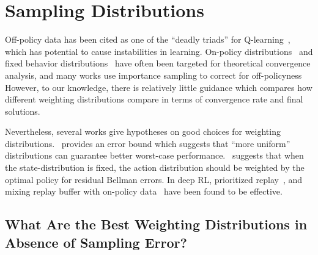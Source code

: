 \section{Sampling Distributions}
\label{sec:sampling_distributions}


Off-policy data has been cited as one of the ``deadly triads'' for Q-learning~\citep{suttonrlbook}, which has potential to cause instabilities in learning. On-policy distributions~\citep{Tsitsiklis1997} and fixed behavior distributions~\citep{Sutton09a,Maei2010} have often been targeted for theoretical convergence analysis, and many works use importance sampling to correct for off-policyness~\citep{precup2001offpol, munos2016safe}
However, to our knowledge, there is relatively little guidance which compares how different weighting distributions compare in terms of convergence rate and final solutions.

Nevertheless, several works give hypotheses on good choices for weighting distributions.~\citep{munos2005erroravi} provides an error bound which suggests that ``more uniform'' distributions can guarantee better worst-case performance.~\citep{NIPS2017_6913} suggests that when the state-distribution is fixed, the action distribution should be weighted by the optimal policy for residual Bellman errors. In deep RL, prioritized replay~\citep{Schaul2015}, and mixing replay buffer with on-policy data~\citep{hausknecht2016policy,zhang2018deeper} have been found to be effective. %

\subsection{What Are the Best Weighting Distributions in Absence of Sampling Error?}
\label{subsec:dist_shift_exact}

